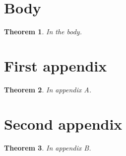 \documentclass{article}
\newtheorem{theorem}{Theorem}[section]
\begin{document}
\section{Body}
\begin{theorem}
In the body.
\end{theorem}
\appendix
\section{First appendix}
\begin{theorem}
In appendix A.
\end{theorem}
\section{Second appendix}
\begin{theorem}
In appendix B.
\end{theorem}
\end{document}
